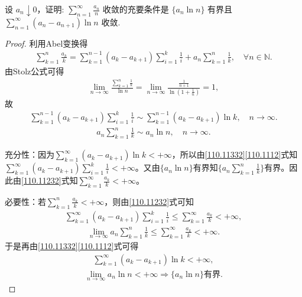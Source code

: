 \documentclass[../../main.tex]{subfiles}
\begin{document}
\begin{example}
设 \( a_n \downarrow 0 \)，证明: \( \sum_{n=1}^{\infty} \frac{a_n}{n} \) 收敛的充要条件是 \( \{a_n \ln n\} \) 有界且 \( \sum_{n=1}^{\infty} (a_n - a_{n+1}) \ln n \) 收敛.
\end{example}
\begin{proof}
利用Abel变换得
\begin{align}
\sum_{k=1}^n{\frac{a_k}{k}}=\sum_{k=1}^{n-1}{\left( a_k-a_{k+1} \right) \sum_{i=1}^k{\frac{1}{i}}}+a_n\sum_{k=1}^n{\frac{1}{k}},\quad \forall n\in \mathbb{N} . \label{110.11232}
\end{align}
由Stolz公式可得
\begin{align*}
\lim_{n\rightarrow \infty}\frac{\sum\limits_{k=1}^n{\frac{1}{k}}}{\ln n}=\lim_{n\rightarrow \infty}\frac{\frac{1}{n+1}}{\ln \left( 1+\frac{1}{n} \right)}=1,
\end{align*}
故
\begin{align}
\sum_{k=1}^{n-1}{\left( a_k-a_{k+1} \right) \sum_{i=1}^k{\frac{1}{i}}}\sim \sum_{k=1}^{n-1}{\left( a_k-a_{k+1} \right) \ln k},\quad n\rightarrow \infty . \label{110.11332}
\end{align}
\begin{align}
a_n\sum_{k=1}^n{\frac{1}{k}}\sim a_n\ln n,\quad n\rightarrow \infty . \label{110.1112}
\end{align}

{\heiti 充分性}：因为$\sum_{k=1}^{\infty}{\left( a_k-a_{k+1} \right) \ln k}<+\infty$，所以由\eqref{110.11332}\eqref{110.1112}式知$\sum_{k=1}^{\infty}{\left( a_k-a_{k+1} \right) \sum_{i=1}^k{\frac{1}{i}}}<+\infty$。又由$\{ a_n\ln n \}$有界知$\{ a_n\sum_{k=1}^n{\frac{1}{k}} \}$有界。因此由\eqref{110.11232}式知$\sum_{k=1}^{\infty}{\frac{a_k}{k}}<+\infty$。

{\heiti 必要性}：若$\sum_{k=1}^n{\frac{a_k}{k}}<+\infty$，则由\eqref{110.11232}式可知
\begin{align*}
\sum_{k=1}^{\infty}{\left( a_k-a_{k+1} \right) \sum_{i=1}^k{\frac{1}{i}}}\leqslant \sum_{k=1}^{\infty}{\frac{a_k}{k}}<+\infty ,
\end{align*}
\begin{align*}
\lim_{n\rightarrow \infty}a_n\sum_{k=1}^n{\frac{1}{k}}\leqslant \sum_{k=1}^{\infty}{\frac{a_k}{k}}<+\infty .
\end{align*}
于是再由\eqref{110.11332}\eqref{110.1112}式可得
\begin{align*}
\sum_{k=1}^{\infty}{\left( a_k-a_{k+1} \right) \ln k}<+\infty ,
\end{align*}
\begin{align*}
\lim_{n\rightarrow \infty}a_n\ln n<+\infty \Longrightarrow \{ a_n\ln n \} \text{有界}.
\end{align*}

\end{proof}
\end{document}
